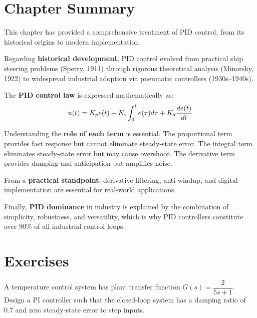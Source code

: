 \section{Chapter Summary}

This chapter has provided a comprehensive treatment of PID control, from its historical origins to modern implementation.

Regarding \textbf{historical development}, PID control evolved from practical ship steering problems (Sperry, 1911) through rigorous theoretical analysis (Minorsky, 1922) to widespread industrial adoption via pneumatic controllers (1930s--1940s).

The \textbf{PID control law} is expressed mathematically as:
\begin{equation*}
u(t) = K_p e(t) + K_i \int_0^t e(\tau) d\tau + K_d \frac{de(t)}{dt}
\end{equation*}

Understanding the \textbf{role of each term} is essential. The proportional term provides fast response but cannot eliminate steady-state error. The integral term eliminates steady-state error but may cause overshoot. The derivative term provides damping and anticipation but amplifies noise.

From a \textbf{practical standpoint}, derivative filtering, anti-windup, and digital implementation are essential for real-world applications.

Finally, \textbf{PID dominance} in industry is explained by the combination of simplicity, robustness, and versatility, which is why PID controllers constitute over 90\% of all industrial control loops.


\newpage
\section{Exercises}

\begin{exercise}
A temperature control system has plant transfer function $G(s) = \dfrac{2}{5s + 1}$. Design a PI controller such that the closed-loop system has a damping ratio of 0.7 and zero steady-state error to step inputs.
\end{exercise}


